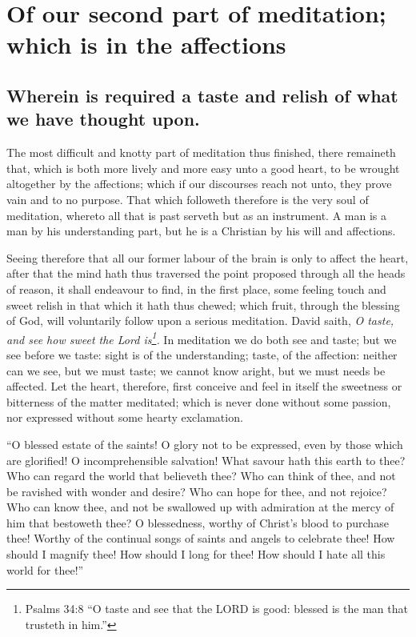 \chapter{Of our second part of meditation; which is in the affections}
\section{Wherein is required a taste and relish of what we have thought upon.}

The most difficult and knotty part of meditation thus finished, there remaineth that, which is both more lively and more easy unto a good heart, to be wrought altogether by the affections; which if our discourses reach not unto, they prove vain and to no purpose. That which followeth therefore is the very soul of meditation, whereto all that is past serveth but as an instrument. A man is a man by his understanding part, but he is a Christian by his will and affections. 

Seeing therefore that all our former labour of the brain is only to affect the heart, after that the mind hath thus traversed the point proposed through all the heads of reason, it shall endeavour to find, in the first place, some feeling touch and sweet relish in that which it hath thus chewed; which fruit, through the blessing of God, will voluntarily follow upon a serious meditation. David saith, \emph{O taste, and see how sweet the Lord is\footnote{Psalms 34:8 ``O taste and see that the LORD is good: blessed is the man that trusteth in him.''}.} In meditation we do both see and taste; but we see before we taste: sight is of the understanding; taste, of the affection: neither can we see, but we must taste; we cannot know aright, but we must needs be affected. Let the heart, therefore, first conceive and feel in itself the sweetness or bitterness of the matter meditated; which is never done without some passion, nor expressed without some hearty exclamation. 

``O blessed estate of the saints! O glory not to be expressed, even by those which are glorified! O incomprehensible salvation! What savour hath this earth to thee? Who can regard the world that believeth thee? Who can think of thee, and not be ravished with wonder and desire? Who can hope for thee, and not rejoice? Who can know thee, and not be swallowed up with admiration at the mercy of him that bestoweth thee? O blessedness, worthy of Christ's blood to purchase thee! Worthy of the continual songs of saints and angels to celebrate thee! How should I magnify thee! How should I long for thee! How should I hate all this world for thee!''

